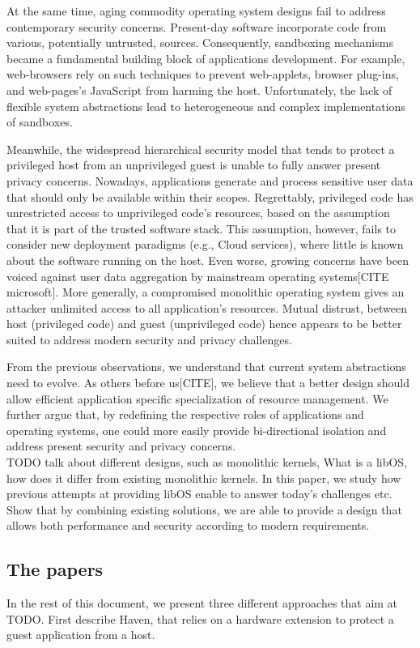 At the same time, aging commodity operating system designs fail to address contemporary security concerns.
Present-day software incorporate code from various, potentially untrusted, sources.
Consequently, sandboxing mechanisms became a fundamental building block of applications development.
For example, web-browsers rely on such techniques to prevent web-applets, browser plug-ins, and web-pages's JavaScript from harming the host.
Unfortunately, the lack of flexible system abstractions lead to heterogeneous and complex implementations of sandboxes.

Meanwhile, the widespread hierarchical security model that tends to protect a privileged host from an unprivileged guest is unable to fully answer present privacy concerns.
Nowadays, applications generate and process sensitive user data that should only be available within their scopes.
Regrettably, privileged code has unrestricted access to unprivileged code's resources, based on the assumption that it is part of the trusted software stack.
This assumption, however, fails to consider new deployment paradigms (e.g., Cloud services), where little is known about the software running on the host.
Even worse, growing concerns have been voiced against user data aggregation by mainstream operating systems[CITE microsoft].
More generally, a compromised monolithic operating system gives an attacker unlimited access to all application's resources.
Mutual distrust, between host (privileged code) and guest (unprivileged code) hence appears to be better suited to address modern security and privacy challenges.

From the previous observations, we understand that current system abstractions need to evolve.
As others before us[CITE], we believe that a better design should allow efficient application specific specialization of resource management.
We further argue that, by redefining the respective roles of applications and operating systems, one could more easily provide bi-directional isolation and address present security and privacy concerns.\\

TODO talk about different designs, such as monolithic kernels, 
What is a libOS, how does it differ from existing monolithic kernels.
In this paper, we study how previous attempts at providing libOS enable to answer today's challenges etc.
Show that by combining existing solutions, we are able to provide a design that allows both performance and security according to modern requirements.


\subsection{The papers}
In the rest of this document, we present three different approaches that aim at TODO.
First describe Haven, that relies on a hardware extension to protect a guest application from a host.
